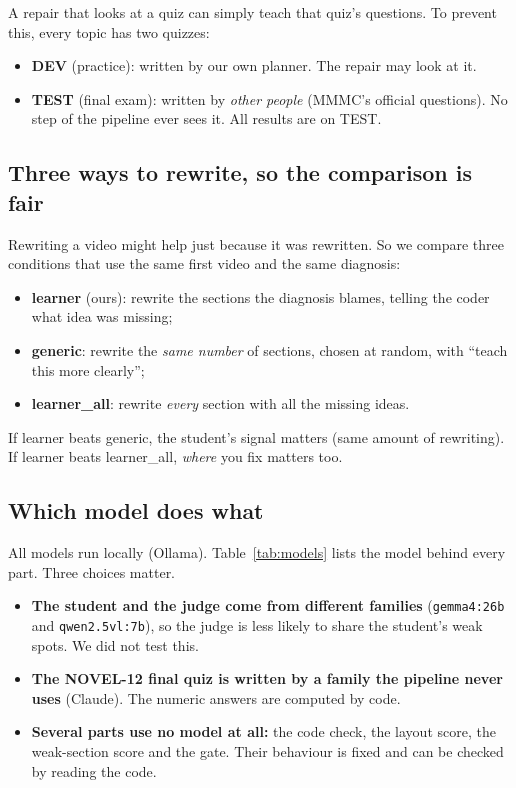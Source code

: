 \documentclass[11pt]{article}
\begin{document}
A repair that looks at a quiz can simply teach that quiz's questions. To prevent this, every topic has two quizzes:
\begin{itemize}
  \item \textbf{DEV} (practice): written by our own planner. The repair may look at it.
  \item \textbf{TEST} (final exam): written by \emph{other people} (MMMC's official questions). No step of the
  pipeline ever sees it. All results are on TEST.
\end{itemize}

\DiagDevTest

\subsection{Three ways to rewrite, so the comparison is fair}

Rewriting a video might help just because it was rewritten. So we compare three conditions that use the same first
video and the same diagnosis:
\begin{itemize}
  \item \textbf{learner} (ours): rewrite the sections the diagnosis blames, telling the coder what idea was missing;
  \item \textbf{generic}: rewrite the \emph{same number} of sections, chosen at random, with ``teach this more
  clearly'';
  \item \textbf{learner\_all}: rewrite \emph{every} section with all the missing ideas.
\end{itemize}
If learner beats generic, the student's signal matters (same amount of rewriting). If learner beats learner\_all,
\emph{where} you fix matters too.

\subsection{Which model does what}

All models run locally (Ollama). Table~\ref{tab:models} lists the model behind every part. Three choices matter.
\begin{itemize}
  \item \textbf{The student and the judge come from different families} (\texttt{gemma4:26b} and
  \texttt{qwen2.5vl:7b}), so the judge is less likely to share the student's weak spots. We did not test this.
  \item \textbf{The NOVEL-12 final quiz is written by a family the pipeline never uses} (Claude). The numeric answers
  are computed by code.
  \item \textbf{Several parts use no model at all:} the code check, the layout score, the weak-section score and the
  gate. Their behaviour is fixed and can be checked by reading the code.
\end{itemize}
\end{document}

